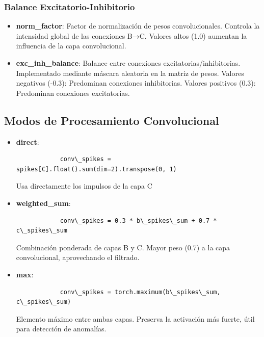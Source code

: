 \subsubsection{Balance Excitatorio-Inhibitorio}

\begin{itemize}
    \item \textbf{norm\_factor}: Factor de normalización de pesos convolucionales. Controla la intensidad global de las conexiones B→C. Valores altos (1.0) aumentan la influencia de la capa convolucional.
    \item \textbf{exc\_inh\_balance}: Balance entre conexiones excitatorias/inhibitorias. Implementado mediante máscara aleatoria en la matriz de pesos. Valores negativos (-0.3): Predominan conexiones inhibitorias. Valores positivos (0.3): Predominan conexiones excitatorias.
\end{itemize}

\subsection{Modos de Procesamiento Convolucional}







\begin{itemize}
    \item \textbf{direct}:
        \begin{lstlisting}
            conv\_spikes = spikes[C].float().sum(dim=2).transpose(0, 1)
        \end{lstlisting}
        
        Usa directamente los impulsos de la capa C
    \item \textbf{weighted\_sum}:
        \begin{lstlisting}
            conv\_spikes = 0.3 * b\_spikes\_sum + 0.7 * c\_spikes\_sum
        \end{lstlisting}
        
        Combinación ponderada de capas B y C. Mayor peso (0.7) a la capa convolucional, aprovechando el filtrado.
    \item \textbf{max}:
        \begin{lstlisting}
            conv\_spikes = torch.maximum(b\_spikes\_sum, c\_spikes\_sum)
        \end{lstlisting}
        
        Elemento máximo entre ambas capas. Preserva la activación más fuerte, útil para detección de anomalías.
\end{itemize}

